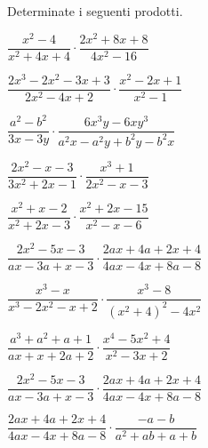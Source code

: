\begin{esercizio}
\label{ese:19.16}
Determinate i seguenti prodotti.
\begin{htmulticols}{2}
\begin{enumeratea}
\item \(\dfrac{x^{2}-4}{x^{2}+4x+4}\cdot \dfrac{2x^{2}+8x+8}{4x^{2}-16}\)
\item 
\(\dfrac{2x^{3}-2x^{2}-3x+3}{2x^{2}-4x+2}\cdot{\dfrac{x^{2}-2x+1}{x^{2}-1}}\)
\item \(\dfrac{a^{2}-b^{2}}{3x-3y}\cdot 
{\dfrac{6x^{3}y-6xy^{3}}{a^{2}x-a^{2}y+b^{2}y-b^{2}x}}\)
\item \(\dfrac{2x^{2}-x-3}{3x^{2}+2x-1}\cdot {\dfrac{x^{3}+1}{2x^{2}-x-3}}\)
\item \(\dfrac{x^{2}+x-2}{x^{2}+2x-3}\cdot {\dfrac{x^{2}+2x-15}{x^{2}-x-6}}\)
\item \(\dfrac{2x^{2}\!-\!5x\!-\!3}{ax\!-\!3a\!+\!x\!-\!3}\cdot 
{\dfrac{2ax\!+\!4a\!+\!2x\!+\!4}{4ax\!-\!4x\!+\!8a\!-\!8}}\)
\item \(\dfrac{x^{3}-x}{x^{3}-2x^{2}-x+2}\cdot 
{\dfrac{x^{3}-8}{\left(x^{2}+4\right)^{2}-4x^{2}}}\)
\item \(\dfrac{a^{3}\!+\!a^{2}\!+\!a\!+\!1}{ax\!+\!x\!+\!2a\!+\!2}\cdot 
{\dfrac{x^{4}\!-\!5x^{2}\!+\!4}{x^{2}\!-\!3x\!+\!2}}\)
\item \(\dfrac{2x^{2}\!-\!5x\!-\!3}{ax\!-\!3a\!+\!x\!-\!3}\cdot 
{\dfrac{2ax\!+\!4a\!+\!2x\!+\!4}{4ax\!-\!4x\!+\!8a\!-\!8}}\)
\item \(\dfrac{2ax\!+\!4a\!+\!2x\!+\!4}{4ax\!-\!4x\!+\!8a\!-\!8}\cdot 
{\dfrac{-a\!-\!b}{a^{2}\!+\!ab\!+\!a\!+\!b}}\)
\end{enumeratea}
\end{htmulticols}
\end{esercizio}

\subsubsection*{}

